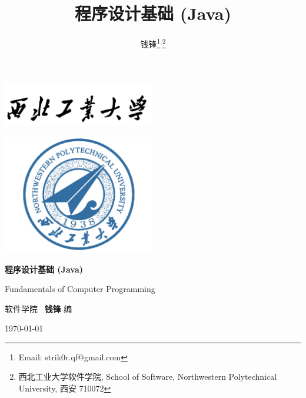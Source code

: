 \documentclass[10pt,UTF8]{book} %
\title{\textbf{程序设计基础 (Java)}}
\author{钱锋\thanks{Email: strik0r.qf@gmail.com}${}^,$\thanks{
    西北工业大学软件学院, School of Software, Northwestern Polytechnical University, 西安 710072
}}
\begin{document}

\pagestyle{empty}
\begin{titlepage}
    \thispagestyle{empty}
    \centering
        \vspace*{2cm}
        \includegraphics[width=0.5\textwidth]{pic/npu_2.png}\par
        \vspace{1em}
        \includegraphics[width=0.5\textwidth]{pic/npu_1.png}\par
    \vspace{1em}
        \begin{center}
            \Huge \heiti \textbf{程序设计基础 (Java)}

            Fundamentals of Computer Programming
        \end{center}
        \vspace{17em}
        \begin{center}
        \songti
        \kaishu 软件学院 \, \heiti\textbf{钱锋} \quad \songti 编
        \vspace{0.5em}

    \today
    \end{center}
\end{titlepage}
\cleardoublepage
\maketitle
\cleardoublepage

\frontmatter
\newpage
\pagestyle{plain}
\makeatother


\end{document}
